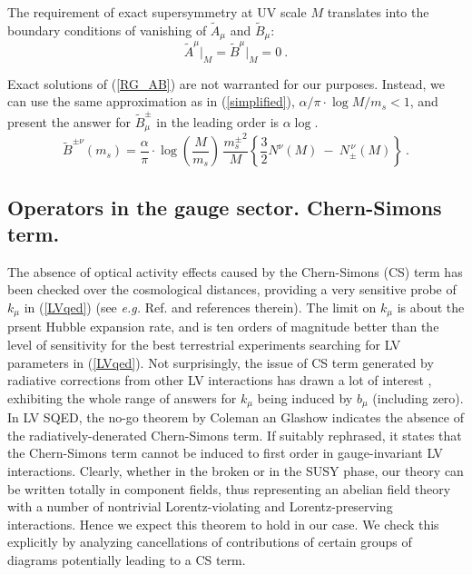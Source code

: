\documentclass[12pt]{revtex4}
\begin{document}
The requirement of exact supersymmetry at UV scale $M$ translates into 
	the boundary conditions of vanishing of $ \widetilde{A}_\mu $ and 
	$ \widetilde{B}_\mu $:
\[
        \widetilde{A}^\mu \Bigr|_M = \widetilde{B}^\mu \Bigr|_M = 0~.
\]  
	
 Exact solutions of (\ref{RG_AB}) are not warranted for our 
purposes. Instead, we can use the same approximation as in (\ref{simplified}),
$ \alpha/\pi \cdot \log M/m_s < 1$,
and present the answer for $\widetilde{B}^\pm_\mu$ in the leading order is 
$\alpha\log$. 
\begin{equation}
\label{B_mu_coef}
\widetilde{B}^{\pm\nu} (m_s)= \frac{\alpha}{\pi}
\cdot \log \left(\frac{M}{m_s}\right)\,
\frac{{m_{s}^\pm}^2 }{M}
\left \{ 
\frac{3}
     {2} N^\nu(M) 
~-~ N_\pm^{\,\nu}(M)
\right \}~.
\end{equation}


\subsection{Operators in the gauge sector. Chern-Simons term.}
\label{SB_gauge_sector}
    
    The absence of optical activity effects caused by the Chern-Simons (CS) term 
    has been checked over the cosmological distances, providing a 
    very sensitive probe of $k_\mu$ in (\ref{LVqed}) 
(see {\em e.g.} Ref. \cite{CFJ} and references therein). 
   The limit on $k_\mu$ is about the prsent Hubble expansion rate, and is ten orders of magnitude 
    better than the level of sensitivity for the best terrestrial experiments searching for 
    LV parameters in (\ref{LVqed}). Not surprisingly, the issue of 
CS term generated by radiative corrections from other LV interactions 
    has drawn a lot of interest \cite{CG,Jackiw:1999yp,Chung:1998jv,Andrianov:2001zj}, 
    exhibiting the whole range of answers for $k_\mu$ being induced by $b_\mu$ (including zero).
    In LV SQED, the no-go theorem by Coleman an Glashow \cite{CG} indicates
    the absence of the radiatively-denerated Chern-Simons term. If suitably rephrased, it states that
    the Chern-Simons term cannot be induced to first order in gauge-invariant
    LV interactions. Clearly, whether in the broken or in the SUSY phase, our theory can be written totally
    in component fields, thus representing an abelian field theory with a number of nontrivial
    Lorentz-violating and Lorentz-preserving interactions.
    Hence we expect this theorem to hold in our case. 
    We check this explicitly by analyzing cancellations of contributions
    of certain groups of diagrams potentially leading to a CS term. 
\end{document}
